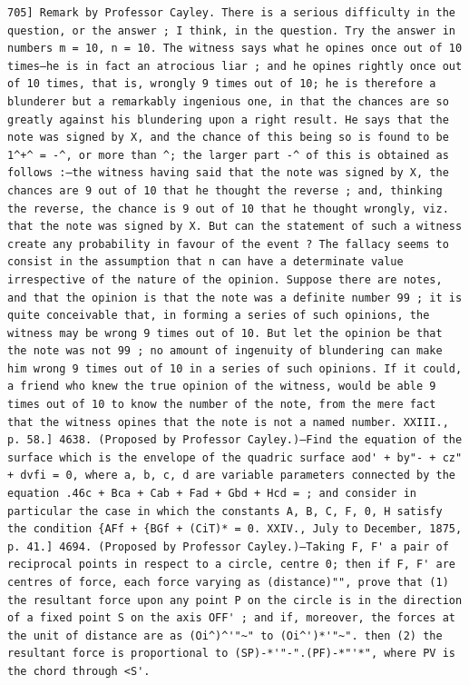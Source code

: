 \documentclass[12pt]{article}
\theoremstyle{plain}
\begin{document}
\newpage
\setcounter{page}{589}
\begin{verbatim}
705] Remark by Professor Cayley. There is a serious difficulty in the question, or the answer ; I think, in the question. Try the answer in numbers m = 10, n = 10. The witness says what he opines once out of 10 times—he is in fact an atrocious liar ; and he opines rightly once out of 10 times, that is, wrongly 9 times out of 10; he is therefore a blunderer but a remarkably ingenious one, in that the chances are so greatly against his blundering upon a right result. He says that the note was signed by X, and the chance of this being so is found to be 1^+^ = -^, or more than ^; the larger part -^ of this is obtained as follows :—the witness having said that the note was signed by X, the chances are 9 out of 10 that he thought the reverse ; and, thinking the reverse, the chance is 9 out of 10 that he thought wrongly, viz. that the note was signed by X. But can the statement of such a witness create any probability in favour of the event ? The fallacy seems to consist in the assumption that n can have a determinate value irrespective of the nature of the opinion. Suppose there are notes, and that the opinion is that the note was a definite number 99 ; it is quite conceivable that, in forming a series of such opinions, the witness may be wrong 9 times out of 10. But let the opinion be that the note was not 99 ; no amount of ingenuity of blundering can make him wrong 9 times out of 10 in a series of such opinions. If it could, a friend who knew the true opinion of the witness, would be able 9 times out of 10 to know the number of the note, from the mere fact that the witness opines that the note is not a named number. XXIII., p. 58.] 4638. (Proposed by Professor Cayley.)—Find the equation of the surface which is the envelope of the quadric surface aod' + by"- + cz" + dvfi = 0, where a, b, c, d are variable parameters connected by the equation .46c + Bca + Cab + Fad + Gbd + Hcd = ; and consider in particular the case in which the constants A, B, C, F, 0, H satisfy the condition {AFf + {BGf + (CiT)* = 0. XXIV., July to December, 1875, p. 41.] 4694. (Proposed by Professor Cayley.)—Taking F, F' a pair of reciprocal points in respect to a circle, centre 0; then if F, F' are centres of force, each force varying as (distance)"", prove that (1) the resultant force upon any point P on the circle is in the direction of a fixed point S on the axis OFF' ; and if, moreover, the forces at the unit of distance are as (Oi^)^'"~" to (Oi^')*'"~". then (2) the resultant force is proportional to (SP)-*'"-".(PF)-*"'*", where PV is the chord through <S'. 
\end{verbatim}
\end{document}
